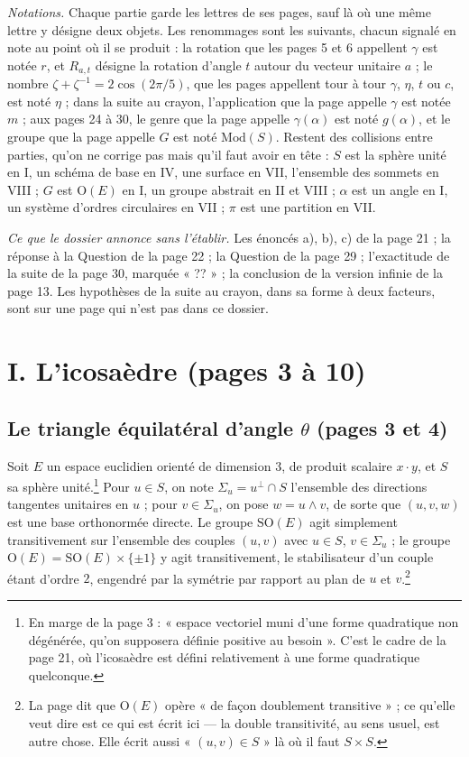 \documentclass[11pt,a4paper]{article}
\begin{document}
\emph{Notations.} Chaque partie garde les lettres de ses pages, sauf là où
une même lettre y désigne deux objets. Les renommages sont les suivants,
chacun signalé en note au point où il se produit : la rotation que les pages
5 et 6 appellent $\gamma$ est notée $r$, et $R_{a,t}$ désigne la rotation
d'angle $t$ autour du vecteur unitaire $a$ ; le nombre
$\zeta + \zeta^{-1} = 2\cos(2\pi/5)$, que les pages appellent tour à tour
$\gamma$, $\eta$, $t$ ou $c$, est noté $\eta$ ; dans la suite au crayon,
l'application que la page appelle $\gamma$ est notée $m$ ; aux pages 24 à 30,
le genre que la page appelle $\gamma(\alpha)$ est noté $g(\alpha)$, et le
groupe que la page appelle $G$ est noté $\mathrm{Mod}(S)$. Restent des
collisions entre parties, qu'on ne corrige pas mais qu'il faut avoir en
tête : $S$ est la sphère unité en I, un schéma de base en IV, une surface en
VII, l'ensemble des sommets en VIII ; $G$ est $\mathrm{O}(E)$ en I, un groupe
abstrait en II et VIII ; $\alpha$ est un angle en I, un système d'ordres
circulaires en VII ; $\pi$ est une partition en VII.

\emph{Ce que le dossier annonce sans l'établir.} Les énoncés a), b), c) de la
page 21 ; la réponse à la Question de la page 22 ; la Question de la page 29 ;
l'exactitude de la suite de la page 30, marquée « ?? » ; la conclusion de la
version infinie de la page 13. Les hypothèses de la suite au crayon, dans sa
forme à deux facteurs, sont sur une page qui n'est pas dans ce dossier.

\section*{I. L'icosaèdre (pages 3 à 10)}

\subsection*{Le triangle équilatéral d'angle $\theta$ (pages 3 et 4)}

Soit $E$ un espace euclidien orienté de dimension $3$, de produit scalaire
$x \cdot y$, et $S$ sa sphère unité.\footnote{En marge de la page 3 : « espace
vectoriel muni d'une forme quadratique non dégénérée, qu'on supposera définie
positive au besoin ». C'est le cadre de la page 21, où l'icosaèdre est défini
relativement à une forme quadratique quelconque.} Pour $u \in S$, on note
$\Sigma_u = u^{\perp} \cap S$ l'ensemble des directions tangentes unitaires en
$u$ ; pour $v \in \Sigma_u$, on pose $w = u \wedge v$, de sorte que
$(u, v, w)$ est une base orthonormée directe. Le groupe $\mathrm{SO}(E)$ agit
simplement transitivement sur l'ensemble des couples $(u, v)$ avec
$u \in S$, $v \in \Sigma_u$ ; le groupe
$\mathrm{O}(E) = \mathrm{SO}(E) \times \{\pm 1\}$ y agit transitivement, le
stabilisateur d'un couple étant d'ordre $2$, engendré par la symétrie par
rapport au plan de $u$ et $v$.\footnote{La page dit que $\mathrm{O}(E)$ opère
« de façon doublement transitive » ; ce qu'elle veut dire est ce qui est
écrit ici --- la double transitivité, au sens usuel, est autre chose. Elle
écrit aussi « $(u,v) \in S$ » là où il faut $S \times S$.}
\end{document}
